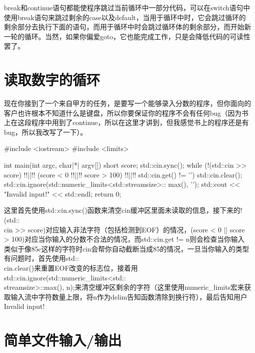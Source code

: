 break和continue语句都能使程序跳过当前循环中一部分代码，可以在switch语句中使用break语句来跳过剩余的case以及default，当用于循环中时，它会跳过循环的剩余部分去执行下面的语句，而用于循环中时会跳过循环体的剩余部分，而开始新一轮的循环。当然，如果你偏爱goto，它也能完成工作，只是会降低代码的可读性罢了。

\section{读取数字的循环}
\label{section:cinscore}

现在你接到了一个来自甲方的任务，是要写一个能够录入分数的程序，但你面向的客户也许根本不知道什么是键盘，所以你要保证你的程序不会有任何bug（因为书上在这段程序中用到了continue，所以在这里才讲到，但我感觉书上的程序还是有bug，所以我改写了一下）。

\begin{cpp}
#include <iostream>
#include <limits>

int main(int argc, char|*| argv[]) {
    short score;
    std::cin.sync();
    while (!(std::cin >> score) !!||!! (score < 0 !!||!! score > 100) !!||!!
            std::cin.get() != '\n') {
        std::cin.clear();
        std::cin.ignore(std::numeric_limits<std::streamsize>::
            max(), '\n');
        std::cout << "Invalid input!" << std::endl;
    }
    return 0;
}
\end{cpp}

这里首先使用std::cin.sync()函数来清空cin缓冲区里面未读取的信息，接下来的!(std::\\ cin >> score)对应输入非法字符（包括检测到EOF）的情况，(score < 0 || score > 100)对应当你输入的分数不合法的情况，而std::cin.get != \leftqm\mybackslash n\rightqm 则会检查当你输入类似于像85c这样的字符时cin会帮你自动截断当成85的情况，一旦当你输入的类型有问题时，首先使用std::\\ cin.clear()来重置EOF改变的标志位，接着用std::cin.ignore(std::numeric\_limits<std::\\ streamsize>::max(), \leftqm\mybackslash n\rightqm);来清空缓冲区剩余的字符（这里使用numeric\_limits宏来获取输入流中字符数量上限，将\leftqm\mybackslash n\rightqm 作为delim告知函数清除到换行符），最后告知用户Invalid input!

\section{简单文件输入/输出}

\addtocounter{subsection}{2}

